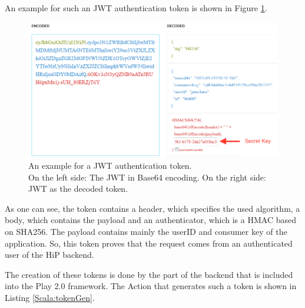 An example for such an \ac{JWT} authentication token is shown in Figure \ref{JWT}.

\begin{figure}[th]
\centerline{\includegraphics[width=1\textwidth]{gfx/JWT_b}}
\caption{An example for a JWT authentication token. \\On the left side: The JWT in Base64 encoding. On the right side: JWT as the decoded token.}
\label{JWT}
\end{figure}

As one can see, the token contains a header, which specifies the used algorithm, a body, which contains the payload and an authenticator, which is a \ac{HMAC} based on \ac{SHA256}. The payload contains mainly the userID and 
consumer key of the application. So, this token proves that the request comes from an authenticated user of the \ac{HiP} backend.

The creation of these tokens is done by the part of the backend that is included into the Play 2.0 framework. The Action that generates such a token is shown in Listing \ref{Scala:tokenGen}.

